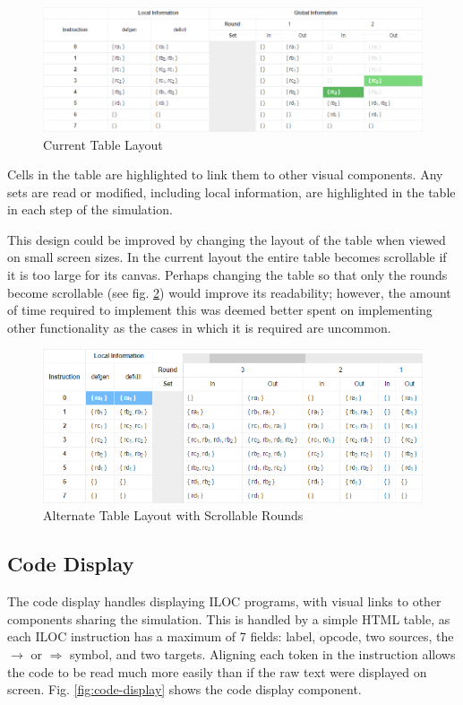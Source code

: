 \documentclass[bsc,twoside,singlespacing,parskip,logo,notimes,normalheadings]{infthesis}
\begin{document}
        \begin{figure}[!ht]
          \centering
          \includegraphics[width=\textwidth]{img/tableofresults.png}
          \caption{Current Table Layout}\label{fig:tableofresults}
        \end{figure}

        Cells in the table are highlighted to link them to other
        visual components. Any sets are read or modified, including
        local information, are highlighted in the table in each step of
        the simulation.

        This design could be improved by changing the layout of the
        table when viewed on small screen sizes. In the current layout
        the entire table becomes scrollable if it is too large for its
        canvas. Perhaps changing the table so that only the rounds
        become scrollable (see fig. \ref{fig:tablescroll})
        would improve its readability; however, the amount of time
        required to implement this was deemed better spent on
        implementing other functionality as the cases in which it is
        required are uncommon.

        \begin{figure}[!ht]
          \centering
          \includegraphics[width=13cm]{img/tablescroll.png}
          \caption{Alternate Table Layout with Scrollable Rounds}\label{fig:tablescroll}
        \end{figure}

        \subsection{Code Display}\label{sec:code-display}
        The code display handles displaying ILOC programs, with visual
        links to other components sharing the simulation. This is
        handled by a simple HTML table, as each ILOC instruction has a
        maximum of 7 fields: label, opcode, two sources, the
        $\rightarrow$ or $\Rightarrow$ symbol, and two
        targets. Aligning each token in the instruction allows the
        code to be read much more easily than if the raw text were
        displayed on screen. Fig. \ref{fig:code-display} shows the
        code display component.
\end{document}
